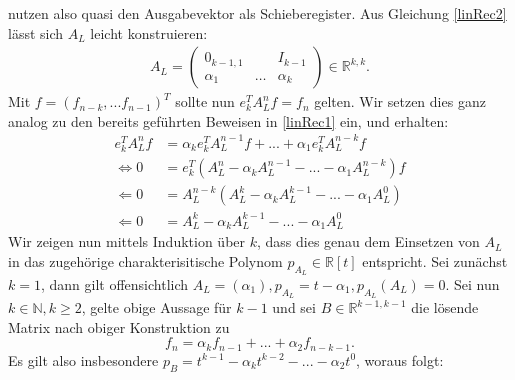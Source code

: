 \documentclass{article}
\theoremstyle{plain} %
\theoremstyle{definition} %
\begin{document}
nutzen also quasi den Ausgabevektor als Schieberegister. Aus Gleichung \ref{linRec2} lässt sich $A_L$ leicht konstruieren:
\begin{align}
  A_L = \begin{pmatrix}
    0_{k-1, 1} &        & I_{k-1}  \\
    \alpha_1   & \hdots & \alpha_k
  \end{pmatrix} \in \mathbb{R}^{k,k}.
\end{align}
Mit $f=(f_{n-k},...f_{n-1})^T$ sollte nun $e_k^T A_L^n f = f_n$ gelten. Wir setzen dies ganz analog zu den bereits geführten Beweisen in \ref{linRec1} ein, und erhalten:
\begin{align*}
  e_k^T A_L^n f & = \alpha_k e_k^T A_L^{n-1} f + ... + \alpha_1 e_k^T A_L^{n-k} f    \\
  \iff 0        & = e_k^T ( A_L^n - \alpha_k A_L^{n-1} - ... - \alpha_1 A_L^{n-k}) f \\
  \Leftarrow 0  & = A_L^{n-k} (A_L^k - \alpha_k A_L^{k-1} - ... - \alpha_1 A_L^{0})  \\
  \Leftarrow 0  & = A_L^k - \alpha_k A_L^{k-1} - ... - \alpha_1 A_L^{0}
\end{align*}
Wir zeigen nun mittels Induktion über $k$, dass dies genau dem Einsetzen von $A_L$ in das zugehörige charakterisitische Polynom $p_{A_L} \in \mathbb{R}[t]$ entspricht.
Sei zunächst $k=1$, dann gilt offensichtlich $A_L = (\alpha_1), p_{A_L} = t - \alpha_1, p_{A_L}(A_L) = 0$. Sei nun $k \in \mathbb{N}, k \geq 2$, gelte obige Aussage für $k-1$ und sei $B \in \mathbb{R}^{{k-1}, {k-1}}$ die lösende Matrix nach obiger Konstruktion zu
$$
  f_n = \alpha_k f_{n-1} + ... + \alpha_2 f_{n-{k-1}}.
$$
Es gilt also insbesondere $p_{B} = t^{k-1} - \alpha_k t^{k-2} - ... - \alpha_2 t^0$, woraus folgt:
\end{document}
